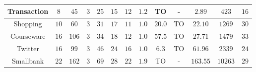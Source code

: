 \begin{table}[t!]
\begin{tabular}{c||ccc||ccc||ccc||c|cc}
 \midrule
 \textsf{Transaction} & $8$ & $45$ & $3$ & $25$ & $15$ & $12$ & $1.2$ & {\tiny TO} & - & $2.89$ & $423$ & $16$\\
 \midrule
 \textsf{Shopping}\cite{MonkeyDB} & $10$ & $60$ & $3$ & $31$ & $17$ & $11$ & $1.0$ & $20.0$ & {\tiny TO} & $22.10$ & $1269$ & $30$\\
 \midrule
 \textsf{Courseware}\cite{MonkeyDB} & $16$ & $106$ & $3$ & $34$ & $18$ & $12$ & $1.0$ & $57.5$ & {\tiny TO} & $27.71$ & $1479$ & $33$\\
 \midrule
 \textsf{Twitter}\cite{MonkeyDB} & $16$ & $99$ & $3$ & $46$ & $24$ & $16$ & $1.0$ & $6.3$ & {\tiny TO} & $61.96$ & $2339$ & $24$\\
 \midrule
 \textsf{Smallbank}\cite{MonkeyDB} & $22$ & $162$ & $3$ & $69$ & $28$ & $22$ & $1.9$ & {\tiny TO} & - & $163.55$ & $10263$ & $29$\\
 \bottomrule
 \end{tabular}
\label{tab:evaluation-detail}
\end{table}

